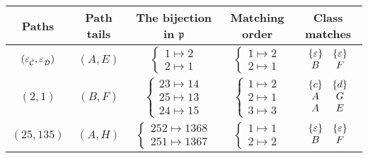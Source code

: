 \begin{tabular}{c|c|c|c|c}
Paths & Path tails & The bijection in $\mathfrak{p}$ & Matching order & Class matches \\
\hline
$(\varepsilon_{\check{\mathcal{C}}},\varepsilon_{\check{\mathcal{D}}})$ & $(A,E)$ & $\begin{cases} 1 \mapsto 2 \\ 2 \mapsto 1\end{cases}$ & $\begin{cases}1 \mapsto 2\\2 \mapsto 1\end{cases}$ & 
$\begin{array}{cc}
    \left\{\varepsilon\right\} & \left\{\varepsilon\right\} \\
    B & F
\end{array}$\\
\hline
$(2,1)$ & $(B,F)$ & $\begin{cases} 23 \mapsto 14 \\ 25 \mapsto 13\\24 \mapsto 15\end{cases}$ & $\begin{cases}1 \mapsto 2\\2 \mapsto 1\\3\mapsto 3\end{cases}$ & $\begin{array}{cc} \left\{c\right\} & \left\{d\right\} \\ A & G \\ A & E\end{array}$\\
\hline
$(25,135)$ & $(A,H)$ & $\begin{cases} 252 \mapsto 1368 \\ 251 \mapsto 1367\end{cases}$ & $\begin{cases}1 \mapsto 1\\2 \mapsto 2\end{cases}$ & $\begin{array}{cc} \left\{\varepsilon\right\} & \left\{\varepsilon\right\}\\ B & F \end{array}$\\
\end{tabular}